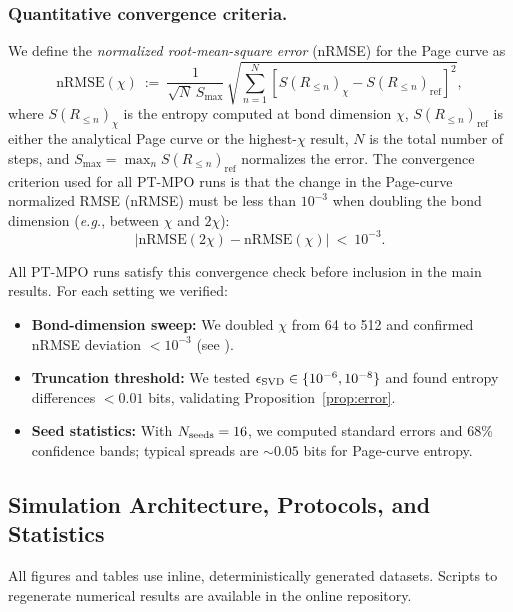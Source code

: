 \documentclass[11pt,a4paper]{article}
\newcommand{\eg}{\textit{e.g.}\xspace}
\theoremstyle{plain}
\theoremstyle{definition}
\theoremstyle{remark}
\begin{document}
\subsubsection{Quantitative convergence criteria.}
We define the \emph{normalized root-mean-square error} (nRMSE) for the Page curve as
\begin{equation}
\mathrm{nRMSE}(\chi) \ :=\ \frac{1}{\sqrt{N}\,S_{\max}}\,\sqrt{\sum_{n=1}^N\left[S(R_{\le n})_{\chi} - S(R_{\le n})_{\mathrm{ref}}\right]^2},
\end{equation}
where $S(R_{\le n})_{\chi}$ is the entropy computed at bond dimension $\chi$, $S(R_{\le n})_{\mathrm{ref}}$ is either the analytical Page curve or the highest-$\chi$ result, $N$ is the total number of steps, and $S_{\max}=\max_n S(R_{\le n})_{\mathrm{ref}}$ normalizes the error. The convergence criterion used for all PT-MPO runs is that the change in the Page-curve normalized RMSE (nRMSE) must be less than $10^{-3}$ when doubling the bond dimension (\eg, between $\chi$ and $2\chi$):
\begin{equation}
\left|\mathrm{nRMSE}(2\chi) - \mathrm{nRMSE}(\chi)\right| \ <\ 10^{-3}.
\end{equation}

All PT-MPO runs satisfy this convergence check before inclusion in the main results. For each setting we verified:
\begin{itemize}[leftmargin=*]
  \item \textbf{Bond-dimension sweep:} We doubled $\chi$ from 64 to 512 and confirmed nRMSE deviation $<10^{-3}$ (see ).
  \item \textbf{Truncation threshold:} We tested $\epsilon_{\rm SVD}\in\{10^{-6},10^{-8}\}$ and found entropy differences $<0.01$ bits, validating Proposition~\ref{prop:error}.
  \item \textbf{Seed statistics:} With $N_{\rm seeds}=16$, we computed standard errors and 68\% confidence bands; typical spreads are $\sim 0.05$ bits for Page-curve entropy.
\end{itemize}

\subsection{Simulation Architecture, Protocols, and Statistics}
\label{sec:methods}
All figures and tables use inline, deterministically generated datasets. Scripts to regenerate numerical results are available in the online repository.
\end{document}
